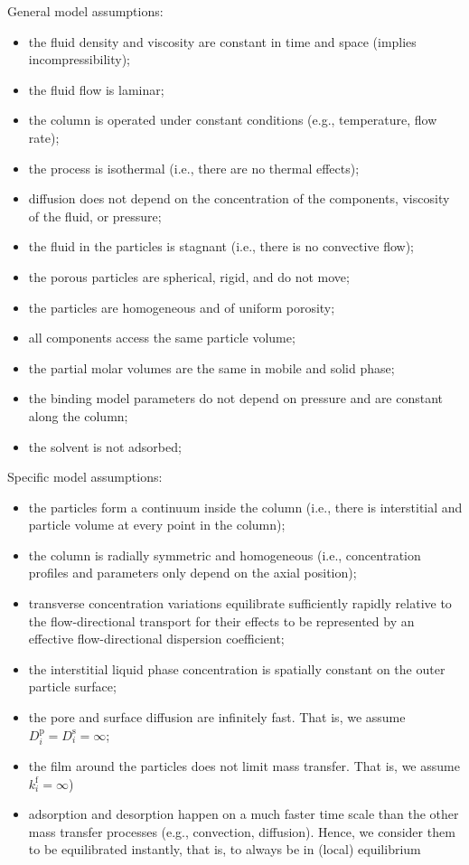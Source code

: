\documentclass{article}
\begin{document}
General model assumptions:
\begin{itemize}
    \item the fluid density and viscosity are constant in time and space (implies incompressibility);
    \item the fluid flow is laminar;
    \item the column is operated under constant conditions (e.g., temperature, flow rate);
    \item the process is isothermal (i.e., there are no thermal effects);
    \item diffusion does not depend on the concentration of the components, viscosity of the fluid, or pressure;
    \item the fluid in the particles is stagnant (i.e., there is no convective flow);
    \item the porous particles are spherical, rigid, and do not move;
    \item the particles are homogeneous and of uniform porosity;
    \item all components access the same particle volume;
    \item the partial molar volumes are the same in mobile and solid phase;
    \item the binding model parameters do not depend on pressure and are constant along the column;
    \item the solvent is not adsorbed;
\end{itemize}

Specific model assumptions:
\begin{itemize}
    \item the particles form a continuum inside the column (i.e., there is interstitial and particle volume at every point in the column);
    \item the column is radially symmetric and homogeneous (i.e., concentration profiles and parameters only depend on the axial position);
    \item transverse concentration variations equilibrate sufficiently rapidly relative to the flow-directional transport for their effects to be represented by an effective flow-directional dispersion coefficient;
    \item the interstitial liquid phase concentration is spatially constant on the outer particle surface;
    \item the pore and surface diffusion are infinitely fast. That is, we assume $D^{\mathrm{p}}_{i} = D^{\mathrm{s}}_{i} = \infty$;
    \item the film around the particles does not limit mass transfer. That is, we assume $k^{\mathrm{f}}_{i} = \infty$)
    \item adsorption and desorption happen on a much faster time scale than the other mass transfer processes (e.g., convection, diffusion). Hence, we consider them to be equilibrated instantly, that is, to always be in (local) equilibrium
\end{itemize}
\end{document}
